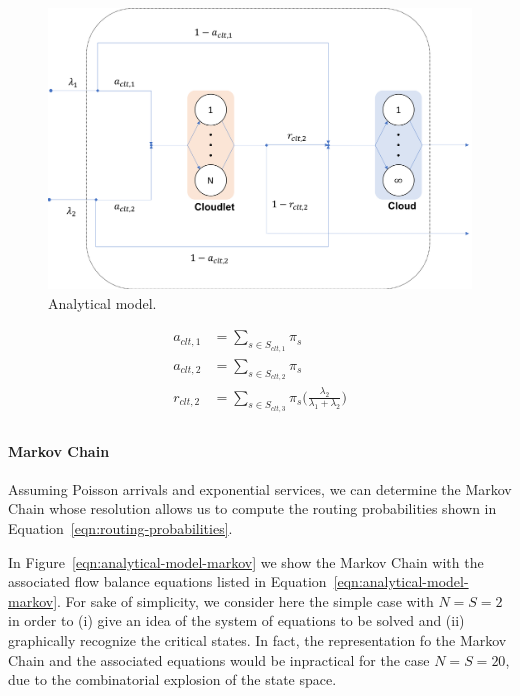 \begin{figure}
	\includegraphics[width=\columnwidth]{fig/analytical-model}
	\caption{Analytical model.}
	\label{fig:analytical-model}
\end{figure}

\begin{equation} 
\begin{split}
a_{clt,1} & = \sum_{s\in S_{clt,1}} \pi_{s} \\
a_{clt,2} & = \sum_{s\in S_{clt,2}} \pi_{s} \\
r_{clt,2} & = \sum_{s\in S_{clt,3}} \pi_{s} \Big(\frac{\lambda_{2}}{\lambda_{1}+\lambda_{2}}\Big) \\
\end{split}
\label{eqn:routing-probabilities}
\end{equation}


\paragraph{Markov Chain}
Assuming Poisson arrivals and exponential services, we can determine the Markov Chain whose resolution allows us to compute the routing probabilities shown in Equation~\ref{eqn:routing-probabilities}.

In Figure~\ref{eqn:analytical-model-markov} we show the Markov Chain with the associated flow balance equations listed in Equation~\ref{eqn:analytical-model-markov}.
For sake of simplicity, we consider here the simple case with $N=S=2$ in order to (i) give an idea of the system of equations to be solved and (ii) graphically recognize the critical states. In fact, the representation fo the Markov Chain and the associated equations would be inpractical for the case $N=S=20$, due to the combinatorial explosion of the state space.

